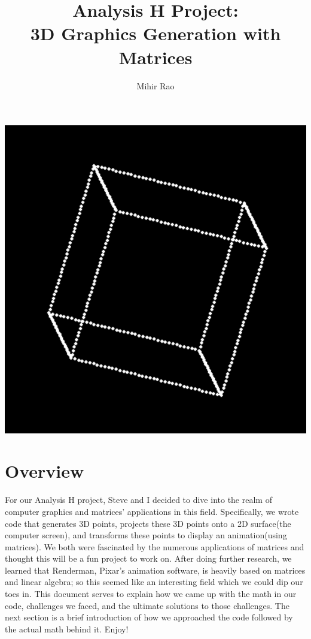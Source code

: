 \documentclass[14pt]{article}
\begin{document}
\title{Analysis H Project: \\ \textbf{3D Graphics Generation with Matrices}}
\author{Mihir Rao}
\maketitle

\begin{center}
	\vspace{3em}
	\includegraphics[scale=0.8]{titleImg}
	\vspace{3em}
\end{center}

\section*{Overview}

For our Analysis H project, Steve and I decided to dive into the realm of computer graphics and matrices' applications in this field. Specifically, we wrote code that generates 3D points, projects these 3D points onto a 2D surface(the computer screen), and transforms these points to display an animation(using matrices). We both were fascinated by the numerous applications of matrices and thought this will be a fun project to work on. After doing further research, we learned that Renderman, Pixar's animation software, is heavily based on matrices and linear algebra; so this seemed like an interesting field which we could dip our toes in. This document serves to explain how we came up with the math in our code, challenges we faced, and the ultimate solutions to those challenges. The next section is a brief introduction of how we approached the code followed by the actual math behind it. Enjoy!
\end{document}
